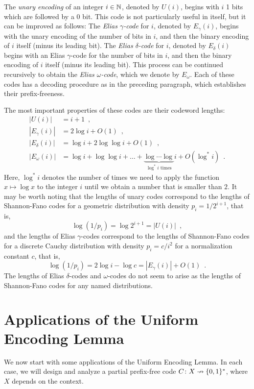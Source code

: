 \documentclass[format=acmsmall, review=false, screen=true]{acmart}
\begin{document}
The \emph{unary encoding} of an integer $i \in \mathbb{N}$, denoted by $U(i)$,
begins with $i$ 1 bits which are followed by a 0 bit. This code is
not particularly useful in itself, but it can be improved as follows:
The \emph{Elias $\gamma$-code} for $i$, denoted by $E_\gamma(i)$,
begins with the unary encoding of the number of bits in $i$, and then
the binary encoding of $i$ itself (minus its leading bit). The
\emph{Elias $\delta$-code} for $i$, denoted by $E_\delta(i)$ begins
with an Elias $\gamma$-code for the number of bits in $i$, and then
the binary encoding of $i$ itself (minus its leading bit). This
process can be continued recursively to obtain the \emph{Elias
  $\omega$-code}, which we denote by $E_\omega$. Each of these codes
has a decoding procedure as in the preceding paragraph, which
establishes their prefix-freeness.

The most important properties of these codes are their codeword
lengths:
\begin{align*}
  |U(i)| &= i + 1 \enspace , \\
  |E_\gamma(i)| &= 2 \log i + O(1) \enspace , \\
  |E_\delta(i)| &= \log i + 2 \log \log i + O(1) \enspace , \\
  |E_\omega(i)| &= \log i + \log \log i + \dots + \underbrace{\log \cdots \log}_{\text{$\log^* i$ times}}i + O(\log^* i) \enspace .
\end{align*}
Here, $\log^* i$ denotes the number of times we need to apply
the function $x \mapsto \log x$ to the integer $i$ until we obtain
a number that is smaller than $2$.
It may be worth noting that the lengths of unary codes correspond to
the lengths of Shannon-Fano codes for a geometric distribution with
density $p_i = 1/2^{i + 1}$, that is, 
\[
  \log (1/p_i) = \log 2^{i + 1} = |U(i)| \enspace ,
\]
and the lengths of Elias $\gamma$-codes correspond to the lengths of
Shannon-Fano codes for a discrete Cauchy distribution with density
$p_i = c/i^2$ for a normalization constant $c$, that is,
\[
  \log (1/p_i) = 2 \log i - \log c = |E_\gamma(i)| + O(1) \enspace .
\]
The lengths of Elias $\delta$-codes and $\omega$-codes do not seem to
arise as the lengths of Shannon-Fano codes for any 
named distributions.

\section{Applications of the Uniform Encoding Lemma}

We now start with some applications of the Uniform Encoding Lemma. In
each case, we will design and analyze a partial prefix-free code
$C\colon X\nrightarrow \{0, 1\}^*$, where $X$ depends on
the context.
\end{document}
